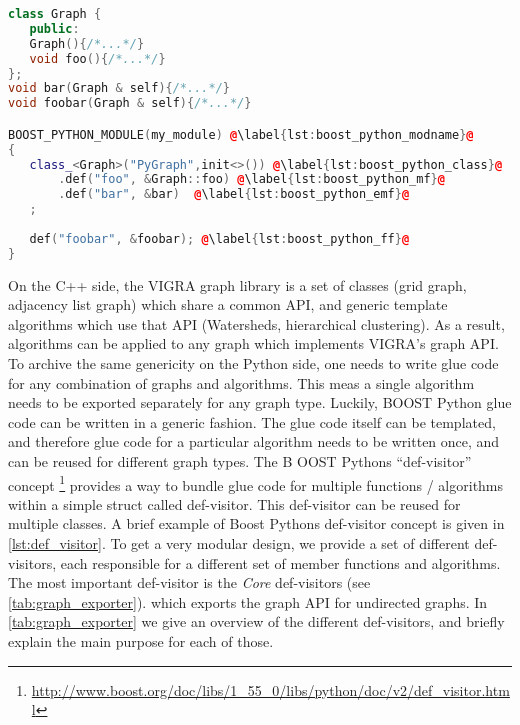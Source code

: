 \vspace{0.3cm}
\begin{lstlisting}[language=c++]
class Graph {
   public:
   Graph(){/*...*/}
   void foo(){/*...*/}
};
void bar(Graph & self){/*...*/}
void foobar(Graph & self){/*...*/}

BOOST_PYTHON_MODULE(my_module) @\label{lst:boost_python_modname}@
{   
   class_<Graph>("PyGraph",init<>()) @\label{lst:boost_python_class}@
       .def("foo", &Graph::foo) @\label{lst:boost_python_mf}@
       .def("bar", &bar)  @\label{lst:boost_python_emf}@
   ;                                      
   
   def("foobar", &foobar); @\label{lst:boost_python_ff}@
}
\end{lstlisting}
\vspace{-1.4cm}

On the C++ side, the VIGRA graph library is a set of classes (\ie grid graph, adjacency list graph) 
which share a common API, 
and generic template algorithms which use that API (\ie Watersheds, hierarchical clustering).
As a result, algorithms can be applied to any graph which implements VIGRA's graph API.
To archive the same genericity on the Python side, one
needs to write glue code for any combination of graphs and algorithms.
This meas a single algorithm needs to be exported separately for any
graph type. 
Luckily, BOOST Python glue code can be written in a generic fashion.
The glue code itself can be templated, and therefore 
glue code for a particular algorithm needs to be written once, 
and can be reused for different graph types.
The B OOST Pythons ``def-visitor'' concept \footnote{\url{http://www.boost.org/doc/libs/1_55_0/libs/python/doc/v2/def_visitor.html}}
provides a way to bundle glue code for multiple functions / algorithms within a simple struct called def-visitor.
This def-visitor can be reused for multiple classes.
A brief example of Boost Pythons def-visitor concept is given in \cref{lst:def_visitor}.
To get a very modular design, we provide a set of different def-visitors,
each responsible for a different set of member functions and algorithms.
The most important def-visitor is the \emph{Core} def-visitors (see \cref{tab:graph_exporter}).
which exports the graph API for undirected graphs.
In \cref{tab:graph_exporter} we give an overview of 
the different def-visitors, and briefly explain the main purpose
for each of those.

